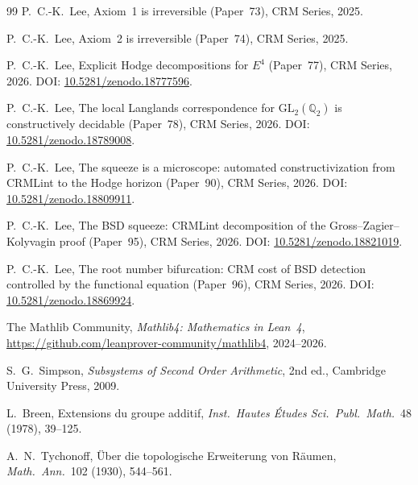\documentclass[11pt,a4paper]{article}
\theoremstyle{plain}
\theoremstyle{definition}
\begin{document}
\begin{thebibliography}{99}
 P.\ C.-K.\ Lee, Axiom~1 is irreversible (Paper~73), CRM Series, 2025.

 P.\ C.-K.\ Lee, Axiom~2 is irreversible (Paper~74), CRM Series, 2025.

 P.\ C.-K.\ Lee, Explicit Hodge decompositions for $E^4$ (Paper~77), CRM Series, 2026. DOI: \href{https://doi.org/10.5281/zenodo.18777596}{10.5281/zenodo.18777596}.

 P.\ C.-K.\ Lee, The local Langlands correspondence for $\mathrm{GL}_2(\mathbb{Q}_2)$ is constructively decidable (Paper~78), CRM Series, 2026. DOI: \href{https://doi.org/10.5281/zenodo.18789008}{10.5281/zenodo.18789008}.

 P.\ C.-K.\ Lee, The squeeze is a microscope: automated constructivization from CRMLint to the Hodge horizon (Paper~90), CRM Series, 2026. DOI: \href{https://doi.org/10.5281/zenodo.18809911}{10.5281/zenodo.18809911}.

 P.\ C.-K.\ Lee, The BSD squeeze: CRMLint decomposition of the Gross--Zagier--Kolyvagin proof (Paper~95), CRM Series, 2026. DOI: \href{https://doi.org/10.5281/zenodo.18821019}{10.5281/zenodo.18821019}.

 P.\ C.-K.\ Lee, The root number bifurcation: CRM cost of BSD detection controlled by the functional equation (Paper~96), CRM Series, 2026. DOI: \href{https://doi.org/10.5281/zenodo.18869924}{10.5281/zenodo.18869924}.

 The Mathlib Community, \emph{Mathlib4: Mathematics in Lean~4}, \url{https://github.com/leanprover-community/mathlib4}, 2024--2026.

 S.\ G.\ Simpson, \emph{Subsystems of Second Order Arithmetic}, 2nd ed., Cambridge University Press, 2009.

 L.\ Breen, Extensions du groupe additif, \emph{Inst.\ Hautes \'Etudes Sci.\ Publ.\ Math.}~48 (1978), 39--125.

 A.\ N.\ Tychonoff, \"Uber die topologische Erweiterung von R\"aumen, \emph{Math.\ Ann.}~102 (1930), 544--561.

\end{thebibliography}
\end{document}
